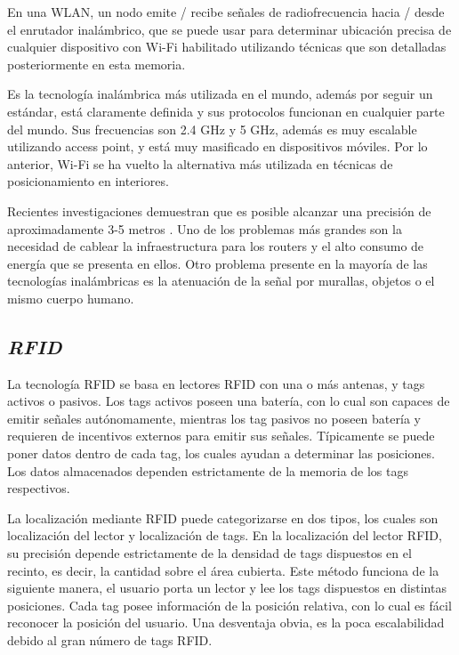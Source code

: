 En una WLAN, un nodo emite / recibe señales de radiofrecuencia hacia / desde el enrutador inalámbrico, que se puede usar para determinar ubicación precisa de cualquier dispositivo con Wi-Fi habilitado utilizando técnicas que son detalladas posteriormente en esta memoria.

Es la tecnología inalámbrica más utilizada en el mundo, además por seguir un estándar, está claramente definida y sus protocolos funcionan en cualquier parte del mundo. Sus frecuencias son 2.4 GHz y 5 GHz, además es muy escalable utilizando access point, y está muy masificado en dispositivos móviles. Por lo anterior, Wi-Fi se ha vuelto la alternativa más utilizada en técnicas de posicionamiento en interiores.

Recientes investigaciones demuestran que es posible alcanzar una precisión de aproximadamente 3-5 metros \citep{6834746}. Uno de los problemas más grandes son la necesidad de cablear la infraestructura para los routers y el alto consumo de energía que se presenta en ellos. Otro problema presente en la mayoría de las tecnologías inalámbricas es la atenuación de la señal por murallas, objetos o el mismo cuerpo humano.

\subsection{\textit{RFID}}

La tecnología RFID se basa en lectores RFID con una o más antenas, y tags activos o pasivos. Los tags activos poseen una batería, con lo cual son capaces de emitir señales autónomamente, mientras los tag pasivos no poseen batería y requieren de incentivos externos para emitir sus señales. Típicamente se puede poner datos dentro de cada tag, los cuales ayudan a determinar las posiciones. Los datos almacenados dependen estrictamente de la memoria de los tags respectivos.

La localización mediante RFID puede categorizarse en dos tipos, los cuales son localización del lector y localización de tags. En la localización del lector RFID, su precisión depende estrictamente de la densidad de tags dispuestos en el recinto, es decir, la cantidad sobre el área cubierta. Este método funciona de la siguiente manera, el usuario porta un lector y lee los tags dispuestos en distintas posiciones. Cada tag posee información de la posición relativa, con lo cual es fácil reconocer la posición del usuario. Una desventaja obvia, es la poca escalabilidad debido al gran número de tags RFID. 

